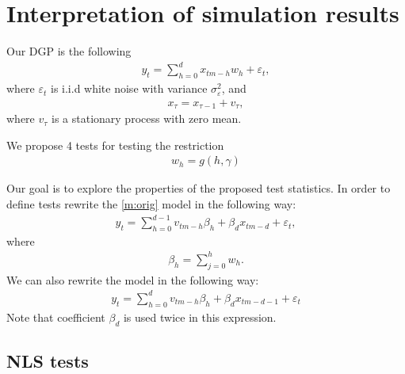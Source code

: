 \documentclass{article}
\begin{document}

\section{Interpretation of simulation results}

Our DGP is the following
\begin{align}\label{m:orig}
    y_t=\sum_{h=0}^{d}x_{tm-h}w_h+\varepsilon_t,
\end{align}
where $\varepsilon_t$ is i.i.d white noise with variance $\sigma_{\varepsilon}^2$, and
\begin{align*}
    x_{\tau}=x_{\tau-1}+v_{\tau},
\end{align*}
where $v_\tau$ is a stationary process with zero mean. 

We propose 4 tests for testing the restriction 
\begin{align*}
    w_h=g(h,\gamma)
\end{align*}

Our goal is to explore the properties of the proposed test statistics. In order to define tests rewrite the  
\eqref{m:orig} model in the following way:
\begin{align}\label{m:td}
    y_t=\sum_{h=0}^{d-1}v_{tm-h}\beta_h+\beta_{d}x_{tm-d}+\varepsilon_t,
\end{align}
where
\begin{align*}
    \beta_h=\sum_{j=0}^hw_h.
\end{align*}
We can also rewrite the model in the following way:
\begin{align}\label{m:nls}
    y_{t}=\sum_{h=0}^{d}v_{tm-h}\beta_h+\beta_{d}x_{tm-d-1}+\varepsilon_t
\end{align}
Note that coefficient $\beta_d$ is used twice in this expression.

\subsection{NLS tests}
\end{document}
